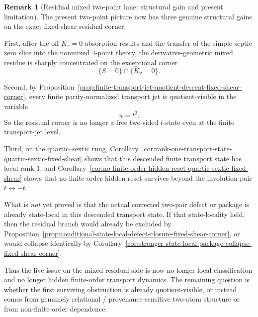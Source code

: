 \documentclass[11pt,a4paper]{amsart}
\theoremstyle{plain}
\theoremstyle{definition}
\newtheorem{remark}[theorem]{Remark}
\begin{document}
\begin{remark}[Residual mixed two-point lane: structural gain and present limitation]
\label{rem:residual-mixed-two-point-lane-structural-gain-limitation}
The present two-point picture now has three genuine structural gains on the
exact fixed-shear residual corner.

First, after the off-$K_v=0$ absorption results and the transfer of the
simple-septic-zero slice into the nonmixed $4$-point theory, the
derivative-geometric mixed residue is sharply concentrated on the exceptional
corner
\[
\{S=0\}\cap\{K_v=0\}.
\]

Second, by
Proposition~\ref{prop:finite-transport-jet-quotient-descent-fixed-shear-corner},
every finite parity-normalized transport jet is quotient-visible in the
variable
\[
u=t^2.
\]
So the residual corner is no longer a free two-sided $t$-state even at the
finite transport-jet level.

Third, on the quartic--sextic rung,
Corollary~\ref{cor:rank-one-transport-state-quartic-sextic-fixed-shear} shows
that this descended finite transport state has local rank $1$, and
Corollary~\ref{cor:no-finite-order-hidden-reset-quartic-sextic-fixed-shear}
shows that no finite-order hidden reset survives beyond the involution pair
$t\leftrightarrow -t$.

What is \emph{not} yet proved is that the actual corrected two-pair defect or
package is already state-local in this descended transport state. If that
state-locality held, then the residual branch would already be excluded by
Proposition~\ref{prop:conditional-state-local-defect-closure-fixed-shear-corner},
or would collapse identically by
Corollary~\ref{cor:stronger-state-local-package-collapse-fixed-shear-corner}.

Thus the live issue on the mixed residual side is now no longer local
classification and no longer hidden finite-order transport dynamics. The
remaining question is whether the first surviving obstruction is already
quotient-visible, or instead comes from genuinely relational /
provenance-sensitive two-atom structure or from non-finite-order dependence.
\end{remark}
\end{document}
